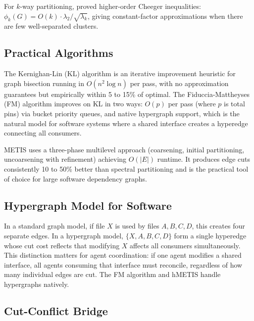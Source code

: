 \documentclass[11pt, a4paper, logo, copyright]{googledeepmind}
\begin{document}
For $k$-way partitioning, \citet{Lee2012cheeger} proved higher-order Cheeger inequalities: $\phi_k(G) = O(k) \cdot \lambda_2 / \sqrt{\lambda_k}$, giving constant-factor approximations when there are few well-separated clusters.

\subsection{Practical Algorithms}

The Kernighan-Lin (KL) algorithm \citep{KernighanLin1970} is an iterative improvement heuristic for graph bisection running in $O(n^2 \log n)$ per pass, with no approximation guarantees but empirically within 5 to 15\% of optimal.
The Fiduccia-Mattheyses (FM) algorithm \citep{FiducciaMattheyses1982} improves on KL in two ways: $O(p)$ per pass (where $p$ is total pins) via bucket priority queues, and native hypergraph support, which is the natural model for software systems where a shared interface creates a hyperedge connecting all consumers.

METIS \citep{KarypisKumar1998} uses a three-phase multilevel approach (coarsening, initial partitioning, uncoarsening with refinement) achieving $O(|E|)$ runtime.
It produces edge cuts consistently 10 to 50\% better than spectral partitioning and is the practical tool of choice for large software dependency graphs.

\subsection{Hypergraph Model for Software}

In a standard graph model, if file $X$ is used by files $A, B, C, D$, this creates four separate edges.
In a hypergraph model, $\{X, A, B, C, D\}$ form a single hyperedge whose cut cost reflects that modifying $X$ affects all consumers simultaneously.
This distinction matters for agent coordination: if one agent modifies a shared interface, all agents consuming that interface must reconcile, regardless of how many individual edges are cut.
The FM algorithm and hMETIS handle hypergraphs natively.

\subsection{Cut-Conflict Bridge}
\end{document}
